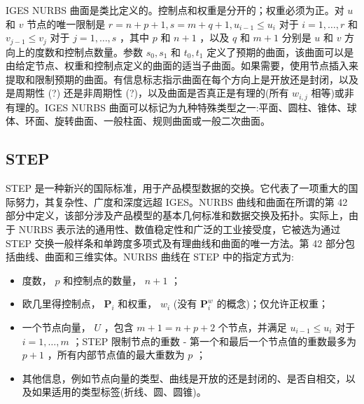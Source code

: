 \documentclass[../main.tex]{subfiles}
\begin{document}
IGES NURBS 曲面是类比定义的。控制点和权重是分开的；权重必须为正。对 \(u\) 和 \(v\) 节点的唯一限制是 \(r = n + p + 1,s = m + q + 1,{u}_{i - 1} \leq  {u}_{i}\) 对于 \(i = 1,\ldots ,r\) 和 \({v}_{j - 1} \leq  {v}_{j}\) 对于 \(j = 1,\ldots ,s\) ，其中 \(p\) 和 \(n + 1\) ，以及 \(q\) 和 \(m + 1\) 分别是 \(u\) 和 \(v\) 方向上的度数和控制点数量。参数 \({s}_{0},{s}_{1}\) 和 \({t}_{0},{t}_{1}\) 定义了预期的曲面，该曲面可以是由给定节点、权重和控制点定义的曲面的适当子曲面。如果需要，使用节点插入来提取和限制预期的曲面。有信息标志指示曲面在每个方向上是开放还是封闭，以及是周期性 (?) 还是非周期性 (?)，以及曲面是否真正是有理的(所有 \({w}_{i,j}\) 相等)或非有理的。IGES NURBS 曲面可以标记为九种特殊类型之一:平面、圆柱、锥体、球体、环面、旋转曲面、一般柱面、规则曲面或一般二次曲面。



\subsection{STEP}
STEP 是一种新兴的国际标准，用于产品模型数据的交换。它代表了一项重大的国际努力，其复杂性、广度和深度远超 IGES。NURBS 曲线和曲面在所谓的第 42 部分中定义，该部分涉及产品模型的基本几何标准和数据交换及拓扑。实际上，由于 NURBS 表示法的通用性、数值稳定性和广泛的工业接受度，它被选为通过 STEP 交换一般样条和单跨度多项式及有理曲线和曲面的唯一方法。第 42 部分包括曲线、曲面和三维实体。NURBS 曲线在 STEP 中的指定方式为:



\begin{itemize}
\item 度数， \(p\) 和控制点的数量， \(n + 1\) ；
\end{itemize}

\begin{itemize}
\item 欧几里得控制点， \({\mathbf{P}}_{i}\) 和权重， \({w}_{i}\) (没有 \({\mathbf{P}}_{i}^{w}\) 的概念)；仅允许正权重；
\end{itemize}

\begin{itemize}
\item 一个节点向量， \(U\) ，包含 \(m + 1 = n + p + 2\) 个节点，并满足 \({u}_{i - 1} \leq  {u}_{i}\) 对于 \(i = 1,\ldots ,m\) ；STEP 限制节点的重数 - 第一个和最后一个节点值的重数最多为 \(p + 1\) ，所有内部节点值的最大重数为 \(p\) ；
\end{itemize}

\begin{itemize}
\item 其他信息，例如节点向量的类型、曲线是开放的还是封闭的、是否自相交，以及如果适用的类型标签(折线、圆、圆锥)。
\end{itemize}
\end{document}
